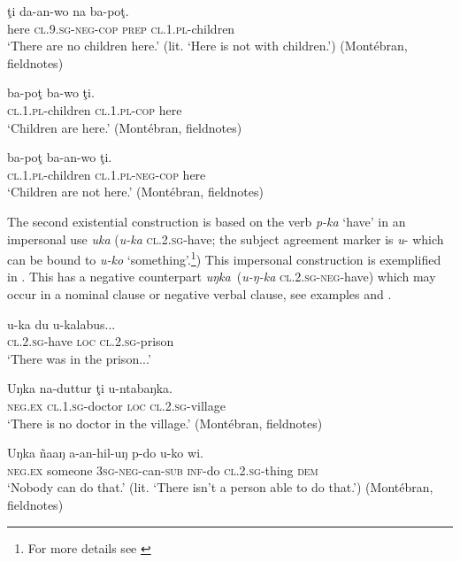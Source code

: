 \documentclass[output=paper,colorlinks,citecolor=brown]{langscibook}
\begin{document}
\ea\label{ex:mank:42}
    \gll ţi da-an-wo na ba-poţ. \\
         here \textsc{cl.9.sg{}-neg-cop} \textsc{prep} \textsc{cl.1.pl}-children \\
    \glt ‘There are no children here.’ (lit. ‘Here is not with children.’) (Montébran, fieldnotes)
\z

\ea\label{ex:mank:43}
    \gll ba-poţ ba-wo ţi. \\
         \textsc{cl.1.pl}-children \textsc{cl.1.pl{}-cop} here \\
    \glt ‘Children are here.’ (Montébran, fieldnotes)
\z

\ea\label{ex:mank:44}
    \gll ba-poţ ba-an-wo ţi.\\
         \textsc{cl.1.pl}-children \textsc{cl.1.pl{}-neg-cop} here\\
    \glt ‘Children are not here.’ (Montébran, fieldnotes)
\z

The second existential construction is based on the verb \textit{p-ka} ‘have’ in an impersonal use \textit{uka} (\textit{u-ka} \textsc{cl.2.sg}{}-have; the subject agreement marker is \textit{u}{}- which can be bound to \textit{u{}-ko} ‘something’.\footnote{For more details see \citet[208]{Gaved2020}}) This impersonal construction is exemplified in . This has a negative counterpart \textit{uŋka}~(\textit{u-ŋ-ka} \textsc{cl.2.sg-neg}{}-have) which may occur in a nominal clause or negative verbal clause, see examples  and .

\ea\label{ex:mank:45}
    \gll u-ka du u-kalabus... \\
         \textsc{cl.2.sg}{}-have \textsc{loc} \textsc{cl.2.sg}{}-prison\\
    \glt ‘There was in the prison...’ \citep[209]{Gaved2020}
\z

\ea\label{ex:mank:46}
    \gll Uŋka na-duttur ţi u-ntabaŋka. \\
         \textsc{neg.ex} \textsc{cl.1.sg}-doctor \textsc{loc} \textsc{cl.2.sg}-village\\
    \glt ‘There is no doctor in the village.’ (Montébran, fieldnotes)
\z

\ea\label{ex:mank:47}
    \gll Uŋka ñaaŋ a-an-hil-uŋ p-do u-ko wi. \\
         \textsc{neg.ex} someone \textsc{3sg{}-neg}-can-\textsc{sub} \textsc{inf}-do \textsc{cl.2.sg}-thing \textsc{dem}\\
    \glt ‘Nobody can do that.’ (lit. ‘There isn't a person able to do that.’) (Montébran, fieldnotes)
\z
\end{document}
